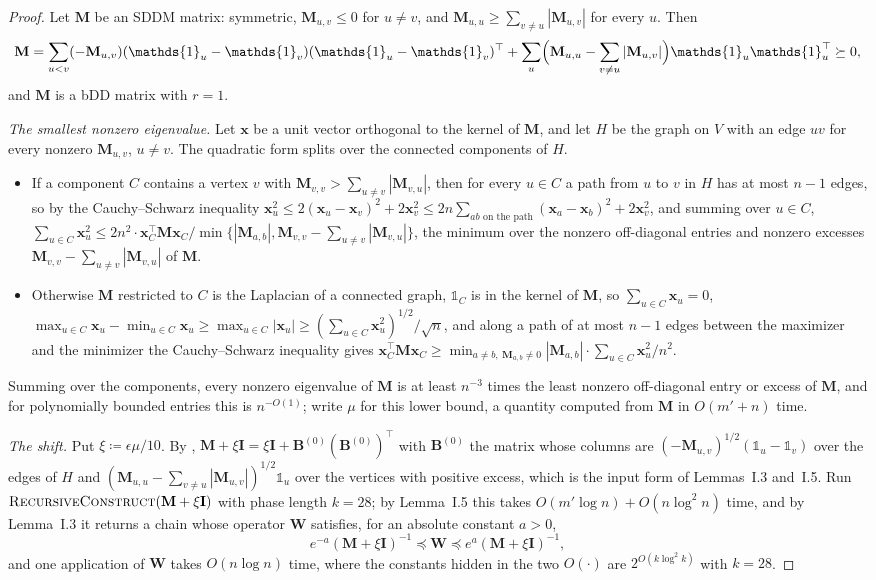 \documentclass[11pt]{article}
\theoremstyle{remark}
\newcommand{\BB}{\mathbf B}
\newcommand{\II}{\mathbf I}
\newcommand{\MM}{\mathbf M}
\newcommand{\WW}{\mathbf W}
\newcommand{\xx}{\mathbf x}
\newcommand{\defeq}{\coloneqq}
\newcommand{\oone}{\mathds{1}}
\begin{document}
\begin{proof}
Let $\MM$ be an SDDM matrix: symmetric, $\MM_{u,v}\le0$ for $u\ne v$, and
$\MM_{u,u}\ge\sum_{v\ne u}|\MM_{u,v}|$ for every $u$.
Then
\begin{equation}\label{eq:sddm-gram}
\MM=\sum_{u<v}(-\MM_{u,v})(\oone_u-\oone_v)(\oone_u-\oone_v)^{\top}
+\sum_{u}\Bigl(\MM_{u,u}-\sum_{v\ne u}|\MM_{u,v}|\Bigr)\oone_u\oone_u^{\top}
\succeq0,
\end{equation}
and $\MM$ is a bDD matrix with $r=1$.

\emph{The smallest nonzero eigenvalue.}
Let $\xx$ be a unit vector orthogonal to the kernel of $\MM$, and let $H$
be the graph on $V$ with an edge $uv$ for every nonzero $\MM_{u,v}$,
$u\ne v$.
The quadratic form  splits over the connected
components of $H$.
\begin{itemize}[leftmargin=*]
\item If a component $C$ contains a vertex $v$ with
$\MM_{v,v}>\sum_{u\ne v}|\MM_{v,u}|$, then for every $u\in C$ a path from
$u$ to $v$ in $H$ has at most $n-1$ edges, so by the Cauchy--Schwarz
inequality
$\xx_u^{2}\le2(\xx_u-\xx_v)^{2}+2\xx_v^{2}
\le2n\sum_{ab\text{ on the path}}(\xx_a-\xx_b)^{2}+2\xx_v^{2}$, and
summing over $u\in C$,
$\sum_{u\in C}\xx_u^{2}\le2n^{2}\cdot
\xx_C^{\top}\MM\xx_C/\min\{|\MM_{a,b}|,\MM_{v,v}-\sum_{u\ne v}|\MM_{v,u}|\}$,
the minimum over the nonzero off-diagonal entries and nonzero excesses
$\MM_{v,v}-\sum_{u\ne v}|\MM_{v,u}|$ of $\MM$.
\item Otherwise $\MM$ restricted to $C$ is the Laplacian of a connected
graph, $\oone_C$ is in the kernel of $\MM$, so $\sum_{u\in C}\xx_u=0$,
$\max_{u\in C}\xx_u-\min_{u\in C}\xx_u\ge\max_{u\in C}|\xx_u|
\ge(\sum_{u\in C}\xx_u^{2})^{1/2}/\sqrt{n}$, and along a path of at most
$n-1$ edges between the maximizer and the minimizer the Cauchy--Schwarz
inequality gives
$\xx_C^{\top}\MM\xx_C\ge\min_{a\ne b,\ \MM_{a,b}\ne0}|\MM_{a,b}|
\cdot\sum_{u\in C}\xx_u^{2}/n^{2}$.
\end{itemize}
Summing over the components, every nonzero eigenvalue of $\MM$ is at least
$n^{-3}$ times the least nonzero off-diagonal entry or excess of $\MM$,
and for polynomially bounded entries this is $n^{-O(1)}$; write $\mu$ for
this lower bound, a quantity computed from $\MM$ in $O(m'+n)$ time.

\emph{The shift.}
Put $\xi\defeq\epsilon\mu/10$.
By , $\MM+\xi\II=\xi\II+\BB^{(0)}(\BB^{(0)})^{\top}$ with
$\BB^{(0)}$ the matrix whose columns are
$(-\MM_{u,v})^{1/2}(\oone_u-\oone_v)$ over the edges of $H$ and
$(\MM_{u,u}-\sum_{v\ne u}|\MM_{u,v}|)^{1/2}\oone_u$ over the vertices with
positive excess, which is the input form of Lemmas~I.3 and~I.5.
Run $\textsc{RecursiveConstruct}(\MM+\xi\II)$ with phase length $k=28$; by
Lemma~I.5 this takes $O(m'\log n)+O(n\log^{2}n)$ time, and by Lemma~I.3 it
returns a chain whose operator $\WW$ satisfies, for an absolute constant
$a>0$,
\begin{equation}\label{eq:chain-W}
e^{-a}(\MM+\xi\II)^{-1}\preceq\WW\preceq e^{a}(\MM+\xi\II)^{-1},
\end{equation}
and one application of $\WW$ takes $O(n\log n)$ time, where the constants
hidden in the two $O(\cdot)$ are $2^{O(k\log^{2}k)}$ with $k=28$.


\end{proof}
\end{document}
